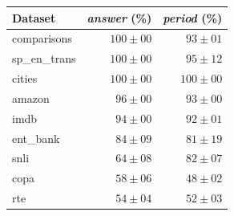     \begin{tabular}{lrr}
        \toprule
        Dataset         &\textit{answer} (\%)&\textit{period} (\%) \\
        \midrule
        comparisons     & $100 \pm 00$ & $ 93 \pm 01$ \\
        sp\_en\_trans   & $100 \pm 00$ & $ 95 \pm 12$ \\
        cities          & $100 \pm 00$ & $100 \pm 00$ \\
        amazon          & $ 96 \pm 00$ & $ 93 \pm 00$ \\
        imdb            & $ 94 \pm 00$ & $ 92 \pm 01$ \\
        ent\_bank       & $ 84 \pm 09$ & $ 81 \pm 19$ \\
        snli            & $ 64 \pm 08$ & $ 82 \pm 07$ \\
        copa            & $ 58 \pm 06$ & $ 48 \pm 02$ \\
        rte             & $ 54 \pm 04$ & $ 52 \pm 03$ \\
        \bottomrule
    \end{tabular}
